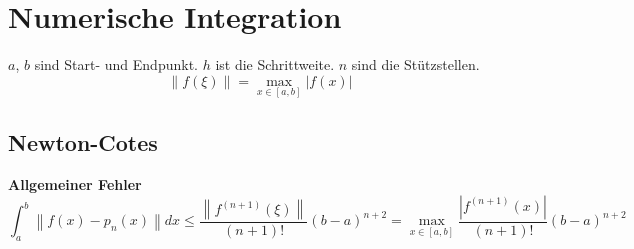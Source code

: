 \documentclass[
ngerman,
accentcolor=9c,%
type=intern,
marginpar=false
]{tudapub}
\begin{document}

    \newpage
    \section{Numerische Integration}
        $a$, $b$ sind Start- und Endpunkt.
        $h$ ist die Schrittweite.
        $n$ sind die Stützstellen.
        \begin{equation*}
            \left\| f(\xi)\right\| = \max_{x \in [a,b] } | f(x)|
        \end{equation*}
        \subsection{Newton-Cotes}
            \textbf{Allgemeiner Fehler}
            \begin{equation*}
                \int_a^b \left\| f(x)  - p_n(x) \right\| dx \leq \dfrac{\left\| f^{(n+1)}(\xi)\right\|}{(n+1)!}(b-a)^{n+2}
                = \max_{x \in [a,b] } \dfrac{ | f^{(n+1)}(x)| }{(n+1)!}(b-a)^{n+2}
            \end{equation*}
\end{document}
